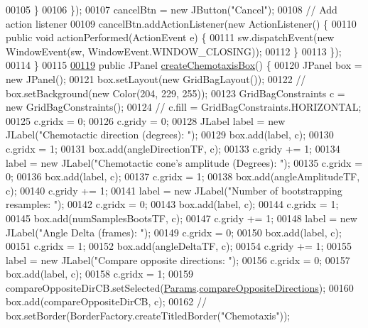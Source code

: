 \begin{DoxyCode}
00105       \}
00106     \});
00107     cancelBtn = \textcolor{keyword}{new} JButton(\textcolor{stringliteral}{"Cancel"});
00108     \textcolor{comment}{// Add action listener}
00109     cancelBtn.addActionListener(\textcolor{keyword}{new} ActionListener() \{
00110       \textcolor{keyword}{public} \textcolor{keywordtype}{void} actionPerformed(ActionEvent e) \{
00111         sw.dispatchEvent(\textcolor{keyword}{new} WindowEvent(sw, WindowEvent.WINDOW\_CLOSING));
00112       \}
00113     \});
00114   \}
00115 
\hypertarget{_settings_window_8java_source_l00119}{}\hyperlink{classgui_1_1_settings_window_a770288d77248b778f94df36a48ba95c3}{00119}   \textcolor{keyword}{public} JPanel \hyperlink{classgui_1_1_settings_window_a770288d77248b778f94df36a48ba95c3}{createChemotaxisBox}() \{
00120     JPanel box = \textcolor{keyword}{new} JPanel();
00121     box.setLayout(\textcolor{keyword}{new} GridBagLayout());
00122     \textcolor{comment}{// box.setBackground(new Color(204, 229, 255));}
00123     GridBagConstraints c = \textcolor{keyword}{new} GridBagConstraints();
00124     \textcolor{comment}{// c.fill = GridBagConstraints.HORIZONTAL;}
00125     c.gridx = 0;
00126     c.gridy = 0;
00128     JLabel label = \textcolor{keyword}{new} JLabel(\textcolor{stringliteral}{"Chemotactic direction (degrees): "});
00129     box.add(label, c);
00130     c.gridx = 1;
00131     box.add(angleDirectionTF, c);
00133     c.gridy += 1;
00134     label = \textcolor{keyword}{new} JLabel(\textcolor{stringliteral}{"Chemotactic cone's amplitude (Degrees): "});
00135     c.gridx = 0;
00136     box.add(label, c);
00137     c.gridx = 1;
00138     box.add(angleAmplitudeTF, c);
00140     c.gridy += 1;
00141     label = \textcolor{keyword}{new} JLabel(\textcolor{stringliteral}{"Number of bootstrapping resamples: "});
00142     c.gridx = 0;
00143     box.add(label, c);
00144     c.gridx = 1;
00145     box.add(numSamplesBootsTF, c);
00147     c.gridy += 1;
00148     label = \textcolor{keyword}{new} JLabel(\textcolor{stringliteral}{"Angle Delta (frames): "});
00149     c.gridx = 0;
00150     box.add(label, c);
00151     c.gridx = 1;
00152     box.add(angleDeltaTF, c);
00154     c.gridy += 1;
00155     label = \textcolor{keyword}{new} JLabel(\textcolor{stringliteral}{"Compare opposite directions: "});
00156     c.gridx = 0;
00157     box.add(label, c);
00158     c.gridx = 1;
00159     compareOppositeDirCB.setSelected(\hyperlink{classdata_1_1_params}{Params}.\hyperlink{classdata_1_1_params_a8c0dba3f8308ea1257549b3cef11ea23}{compareOppositeDirections});
00160     box.add(compareOppositeDirCB, c);
00162     \textcolor{comment}{// box.setBorder(BorderFactory.createTitledBorder("Chemotaxis"));}

\end{DoxyCode}
